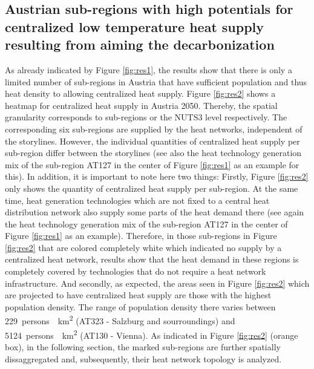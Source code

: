 \subsection{Austrian sub-regions with high potentials for centralized low temperature heat supply resulting from aiming the decarbonization}\label{res:3}
As already indicated by Figure \ref{fig:res1}, the results show that there is only a limited number of sub-regions in Austria that have sufficient population and thus heat density to allowing centralized heat supply. Figure \ref{fig:res2} shows a heatmap for centralized heat supply in Austria 2050. Thereby, the spatial granularity corresponds to sub-regions or the NUTS3 level respectively. The corresponding six sub-regions are supplied by the heat networks, independent of the storylines. However, the individual quantities of centralized heat supply per sub-region differ between the storylines (see also the heat technology generation mix of the sub-region AT127 in the center of Figure \ref{fig:res1} as an example for this). In addition, it is important to note here two things: Firstly, Figure \ref{fig:res2} only shows the quantity of centralized heat supply per sub-region. At the same time, heat generation technologies which are not fixed to a central heat distribution network also supply some parts of the heat demand there (see again the heat technology generation mix of the sub-region AT127 in the center of Figure \ref{fig:res1} as an example). Therefore, in those sub-regions in Figure \ref{fig:res2} that are colored completely white which indicated no supply by a centralized heat network, results show that the heat demand in these regions is completely covered by technologies that do not require a heat network infrastructure. And secondly, as expected, the areas seen in Figure \ref{fig:res2} which are projected to have centralized heat supply are those with the highest population density. The range of population density there varies between \SI{229}{persons \per \kilo\metre^2} (AT323 - Salzburg and sourroundings) and \SI{5124}{persons \per \kilo\metre^2} (AT130 - Vienna). As indicated in Figure \ref{fig:res2} (orange box), in the following section, the marked sub-regions are further spatially dissaggregated and, subsequently, their heat network topology is analyzed. 

